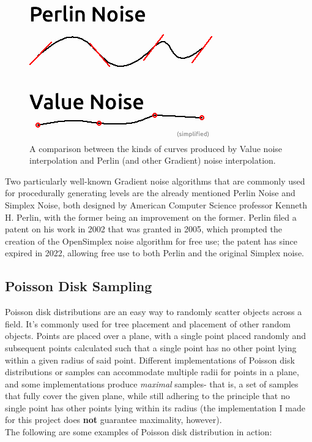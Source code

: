 \begin{figure}[H]
    \centering
    \includegraphics[width=\textwidth]{Images/valueperlincomparison.png}
    \caption{A comparison between the kinds of curves produced by Value noise interpolation and Perlin (and other Gradient) noise interpolation.\cite{perlinvalue}}
    \label{fig:valueperlincomparison}
\end{figure}

Two particularly well-known Gradient noise algorithms that are commonly used for procedurally generating levels are the already mentioned Perlin Noise and Simplex Noise, both designed by American Computer Science professor Kenneth H. Perlin, with the former being an improvement on the former. Perlin filed a patent on his work in 2002 that was granted in 2005\cite{perlinpatent}, which prompted the creation of the OpenSimplex noise algorithm\cite{enwiki:1102898483} for free use; the patent has since expired in 2022, allowing free use to both Perlin and the original Simplex noise.\cite{perlinpatent}

\subsection{Poisson Disk Sampling}

Poisson disk distributions are an easy way to randomly scatter objects across a field. It's commonly used for tree placement and placement of other random objects. Points are placed over a plane, with a single point placed randomly and subsequent points calculated such that a single point has no other point lying within a given radius of said point. Different implementations of Poisson disk distributions or samples can accommodate multiple radii for points in a plane, and some implementations produce \textit{maximal} samples- that is, a set of samples that fully cover the given plane, while still adhering to the principle that no single point has other points lying within its radius (the implementation I made for this project does \textbf{not} guarantee maximality, however).\\The following are some examples of Poisson disk distribution in action:

